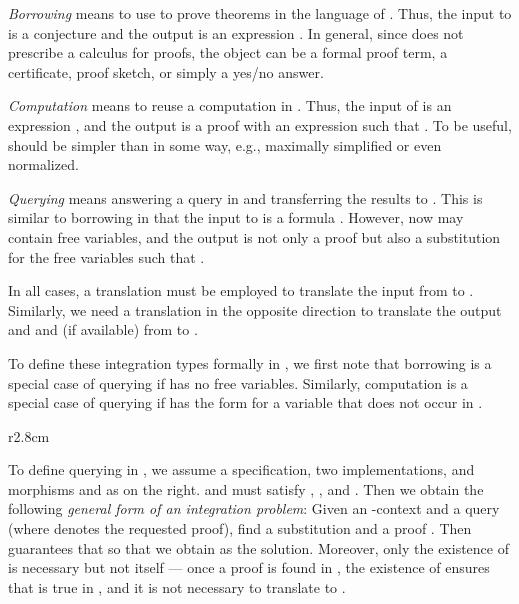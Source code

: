 \emph{Borrowing} means to use  to prove theorems in the language of . Thus, the input to  is a conjecture  and the output is an expression . In general, since {\MMT} does not prescribe a calculus for proofs, the object  can be a formal proof term, a certificate, proof sketch, or simply a yes/no answer.

\emph{Computation} means to reuse a  computation in . Thus, the input of  is an expression , and the output is a proof  with an expression  such that . To be useful,  should be simpler than  in some way, e.g., maximally simplified or even normalized.

\emph{Querying} means answering a query in  and transferring the results to . This is similar to borrowing in that the input to  is a formula . However, now  may contain free variables, and the output is not only a proof  but also a substitution  for the free variables such that .

In all cases, a translation  must be employed to translate the input from  to
.  Similarly, we need a translation  in the opposite direction to translate the
output  and  and (if available)  from  to .



To define these integration types formally in {\MMT}, we first note that borrowing is a special case of querying if  has no free variables. Similarly, computation is a special case of querying if  has the form  for a variable  that does not occur in . 

\begin{wrapfigure}{r}{2.8cm}
\vspace*{-2.5em}
\vspace*{-3.5em}
\end{wrapfigure}

To define querying in {\MMT}, we assume a specification, two implementations, and
morphisms  and  as on the right.  and  must satisfy
, , and
.  Then we obtain the following \emph{general form of an
  integration problem}: Given an -context  and a query  (where
 denotes the requested proof), find a substitution  and a proof
. Then {\MMT} guarantees that  so that we
obtain  as the solution.
Moreover, only the existence of  is necessary but not  itself --- once a proof  is found in , the existence of  ensures that  is true in , and it is not necessary to
translate  to .
\medskip

